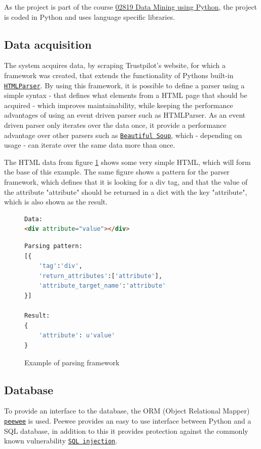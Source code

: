\documentclass[10pt]{IEEEtran}
\begin{document}
As the project is part of the course \href{http://www.kurser.dtu.dk/02819.aspx?menulanguage=en-GB}{02819 Data Mining using Python}, the project is coded in Python and uses language specific libraries.

\subsection{Data acquisition}
The system acquires data, by scraping Trustpilot's website, for which a framework was created, that extends the functionality of Pythons built-in \href{http://docs.python.org/2/library/htmlparser.html}{\texttt{HTMLParser}}. By using this framework, it is possible to define a parser using a simple syntax - that defines what elements from a HTML page that should be acquired - which improves maintainability, while keeping the performance advantages of using an event driven parser such as HTMLParser. As an event driven parser only iterates over the data once, it provide a performance advantage over other parsers such as \href{http://www.crummy.com/software/BeautifulSoup/}{\texttt{Beautiful Soup}}, which - depending on usage - can iterate over the same data more than once.

The HTML data from figure \ref{fig:pattern} shows some very simple HTML, which will form the base of this example. The same figure shows a pattern for the parser framework, which defines that it is looking for a div tag, and that the value of the attribute "attribute" should be returned in a dict with the key "attribute", which is also shown as the result.

\begin{figure}[h!]
\begin{lstlisting}[language=HTML]
Data:
<div attribute="value"></div>
\end{lstlisting}

\begin{lstlisting}[language=Python]
Parsing pattern:
[{
    'tag':'div',
    'return_attributes':['attribute'],
    'attribute_target_name':'attribute'
}]

Result:
{
	'attribute': u'value'
}
\end{lstlisting}
\caption{Example of parsing framework \label{fig:pattern}}
\end{figure}

\vspace*{-5mm}
\subsection{Database}
To provide an interface to the database, the ORM (Object Relational Mapper) \href{http://peewee.readthedocs.org/en/latest/}{\texttt{peewee}} is used. Peewee provides an easy to use interface between Python and a SQL database, in addition to this it provides protection against the commonly known vulnerability \href{https://www.owasp.org/index.php/Top_10_2013-A1-Injection}{\texttt{SQL injection}}.
\end{document}
